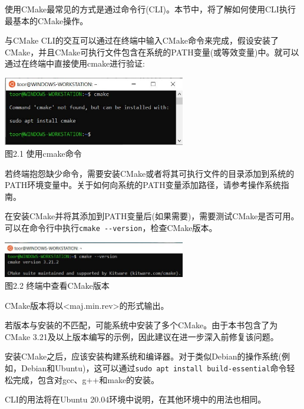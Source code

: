 
使用CMake最常见的方式是通过命令行(CLI)。本节中，将了解如何使用CLI执行最基本的CMake操作。

与CMake CLI的交互可以通过在终端中输入CMake命令来完成，假设安装了CMake，并且CMake可执行文件包含在系统的PATH变量(或等效变量)中。就可以通过在终端中直接使用cmake进行验证:

\begin{center}
\includegraphics[width=0.6\textwidth]{content/1/chapter2/images/1.jpg}\\
图2.1 使用cmake命令
\end{center}

若终端抱怨缺少命令，需要安装CMake或者将其可执行文件的目录添加到系统的PATH环境变量中。关于如何向系统的PATH变量添加路径，请参考操作系统指南。

在安装CMake并将其添加到PATH变量后(如果需要)，需要测试CMake是否可用。可以在命令行中执行\texttt{cmake -{}-version}，检查CMake版本。

\begin{center}
\includegraphics[width=0.6\textwidth]{content/1/chapter2/images/2.jpg}\\
图2.2 终端中查看CMake版本
\end{center}

CMake版本将以<maj.min.rev>的形式输出。

\begin{tcolorbox}[colback=webgreen!5!white,colframe=webgreen!75!black,title=Note]
若版本与安装的不匹配，可能系统中安装了多个CMake。由于本书包含了为CMake 3.21及以上版本编写的示例，因此建议在进一步深入前修复该问题。
\end{tcolorbox}

安装CMake之后，应该安装构建系统和编译器。对于类似Debian的操作系统(例如，Debian和Ubuntu)，这可以通过\texttt{sudo apt install build-essential}命令轻松完成，包含对gcc、g++和make的安装。

CLI的用法将在Ubuntu 20.04环境中说明，在其他环境中的用法也相同。


